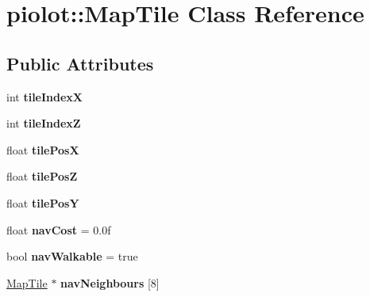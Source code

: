 \hypertarget{classpiolot_1_1_map_tile}{}\section{piolot\+:\+:Map\+Tile Class Reference}
\label{classpiolot_1_1_map_tile}
\subsection*{Public Attributes}
\begin{DoxyCompactItemize}
\item 
\mbox{\label{classpiolot_1_1_map_tile_ab1585fe7db159adb817540c7aa23729a}} 
int {\bfseries tile\+IndexX}
\item 
\mbox{\label{classpiolot_1_1_map_tile_ad32071e9a413708d23c3ff98a49a654a}} 
int {\bfseries tile\+IndexZ}
\item 
\mbox{\label{classpiolot_1_1_map_tile_a20153a41995e1fc00ae404bb0beea51d}} 
float {\bfseries tile\+PosX}
\item 
\mbox{\label{classpiolot_1_1_map_tile_a2581410650fd7b09bf27aada53a652e7}} 
float {\bfseries tile\+PosZ}
\item 
\mbox{\label{classpiolot_1_1_map_tile_aadf32877f16a8e69a591c64084da2667}} 
float {\bfseries tile\+PosY}
\item 
\mbox{\label{classpiolot_1_1_map_tile_a0a8329aad9563449e69940e754c0eab7}} 
float {\bfseries nav\+Cost} = 0.\+0f
\item 
\mbox{\label{classpiolot_1_1_map_tile_a917058380d87af864438c30f3a65c774}} 
bool {\bfseries nav\+Walkable} = true
\item 
\mbox{\label{classpiolot_1_1_map_tile_acc1c622d4a9446293840af35180f61d7}} 
\mbox{\hyperlink{classpiolot_1_1_map_tile}{Map\+Tile}} $\ast$ {\bfseries nav\+Neighbours} \mbox{[}8\mbox{]}
\item 
\mbox{\label{classpiolot_1_1_map_tile_ace07e3f8b0ef22f37759d1dd37e54a03}} 

\end{DoxyCompactItemize}
